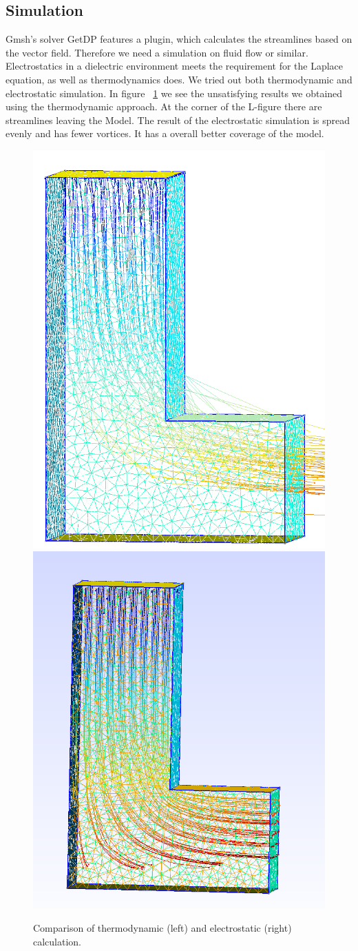 \documentclass[preprint,journal]{vgtc}       %
\begin{document}
\subsection{Simulation}
Gmsh's solver GetDP features a plugin, which calculates the streamlines based on the vector field. 
Therefore we need a simulation on fluid flow or similar. 
Electrostatics in a dielectric environment meets the requirement for the Laplace equation, as well as thermodynamics does.
We tried out both thermodynamic and electrostatic simulation. 
In figure ~\ref{fig:L} we see the unsatisfying results we obtained using the thermodynamic approach. 
At the corner of the L-figure there are streamlines leaving the Model. 
The result of the electrostatic simulation is spread evenly and has fewer vortices. 
It has a overall better coverage of the model.

\begin{figure}
	
	\begin{minipage}{\linewidth}
		\includegraphics[width=.5\linewidth]{L.PNG} 
		\includegraphics[width=.53\linewidth]{L-ele.png}
		\caption{Comparison of thermodynamic (left) and electrostatic (right) calculation.}
		\label{fig:L}
	\end{minipage}
\end{figure}
\end{document}
